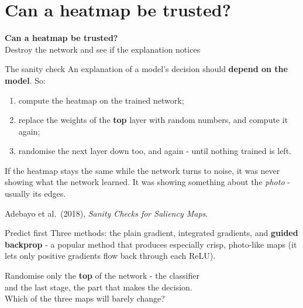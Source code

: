 \documentclass[aspectratio=169]{beamer}
\newcommand{\keybox}[1]{%
  \begin{tcolorbox}[colback=armblue!8, colframe=armblue, boxrule=0.6pt, arc=2pt]
  #1
  \end{tcolorbox}}
\newcommand{\sectiontransition}[2]{%
  \begin{frame}[plain]
    \vfill
    \begin{center}
      {\Huge\bfseries\color{popblue} #1}\\[1.1em]
      {\large #2}
    \end{center}
    \vfill
  \end{frame}}
\begin{document}
\section{Can a heatmap be trusted?}
\sectiontransition{Can a heatmap be trusted?}{Destroy the network and see if the explanation notices}

\begin{frame}{The sanity check}
  \vspace{0.5em}
  An explanation of a model's decision should \textbf{depend on the model}. So:

  \vspace{0.4em}
  \begin{enumerate}
    \item compute the heatmap on the trained network;
    \item replace the weights of the \textbf{top} layer with random numbers, and compute it again;
    \item randomise the next layer down too, and again - until nothing trained is left.
  \end{enumerate}

  \vspace{0.6em}
  \keybox{\small If the heatmap stays the same while the network turns to noise, it was never
  showing what the network learned. It was showing something about the \emph{photo} - usually its
  edges.}

  \vspace{0.3em}
  {\footnotesize Adebayo et al.\ (2018), \emph{Sanity Checks for Saliency Maps}.}
\end{frame}

\begin{frame}{Predict first}
  \vspace{1.0em}
  Three methods: the plain gradient, integrated gradients, and \textbf{guided backprop} - a popular
  method that produces especially crisp, photo-like maps (it lets only positive gradients flow
  back through each ReLU).

  \vspace{1.2em}
  \begin{center}
    {\large Randomise only the \textbf{top} of the network - the classifier\\[0.2em]
    and the last stage, the part that makes the decision.\\[0.6em]
    Which of the three maps will barely change?}
  \end{center}
\end{frame}
\end{document}
